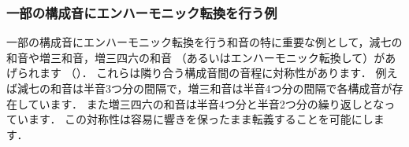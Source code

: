 \documentclass[dvipdfmx,uplatex,b5paper,openany,jbase=12Q,nomag*,textwidth-limit=44%
               ]{gachimuchi}
\begin{document}
\begin{floatMusic}[pos=ht,width=.6\linewidth]
  \nostartrule%
  \Startpiece
  \Notes%
  \en\setdoublebar{}\ignorenats\changecontext%
  \Notes%
  \en\setdoublebar
  \endpiece
\end{floatMusic}


\subsubsection{一部の構成音にエンハーモニック転換を行う例}
一部の構成音にエンハーモニック転換を行う和音の特に重要な例として，減七の和音や増三和音，増三四六の和音
（あるいはエンハーモニック転換して\txCirc{}）があげられます
（）．
これらは隣り合う構成音間の音程に対称性があります．
例えば減七の和音は半音3つ分の間隔で，増三和音は半音4つ分の間隔で各構成音が存在しています．
また増三四六の和音は半音4つ分と半音2つ分の繰り返しとなっています．
この対称性は容易に響きを保ったまま転義することを可能にします．
\end{document}
